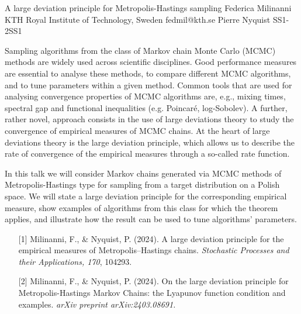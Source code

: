 \begin{talk}
  {A large deviation principle for Metropolis-Hastings sampling}%
  {Federica Milinanni}%
  {KTH Royal Institute of Technology, Sweden}%
  {fedmil@kth.se}%
  {Pierre Nyquist}%
{}{}{SS1-2}{SS1}

			
Sampling algorithms from the class of Markov chain Monte Carlo (MCMC) methods are widely used across scientific disciplines. Good performance measures are essential to analyse these methods, to compare different MCMC algorithms, and to tune parameters within a given method. Common tools that are used for analysing convergence properties of MCMC algorithms are, e.g., mixing times, spectral gap and functional inequalities (e.g. Poincaré, log-Sobolev). A further, rather novel, approach consists in the use of large deviations theory to study the convergence of empirical measures of MCMC chains. At the heart of large deviations theory is the large deviation principle, which allows us to describe the rate of convergence of the empirical measures through a so-called rate function.

In this talk we will consider Markov chains generated via MCMC methods of Metropolis-Hastings type for sampling from a target distribution on a Polish space. We will state a large deviation principle for the corresponding empirical measure, show examples of algorithms from this class for which the theorem applies, and illustrate how the result can be used to tune algorithms' parameters.

\medskip

\begin{enumerate}
	\item[{[1]}] Milinanni, F., \& Nyquist, P. (2024). A large deviation principle for the empirical measures of Metropolis–Hastings chains. \textit{Stochastic Processes and their Applications, 170}, 104293.
	\item[{[2]}] Milinanni, F., \& Nyquist, P. (2024). On the large deviation principle for Metropolis-Hastings Markov Chains: the Lyapunov function condition and examples. \textit{arXiv preprint arXiv:2403.08691.}
\end{enumerate}


\end{talk}

